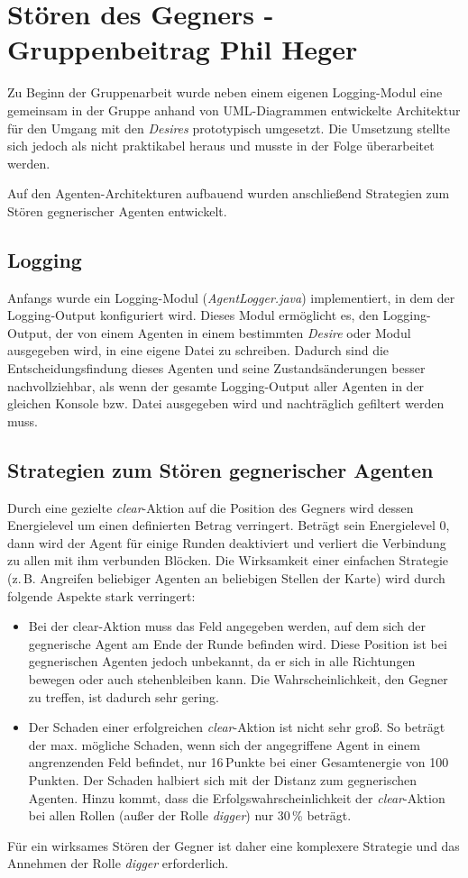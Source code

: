\documentclass[runningheads]{llncs}
\begin{document}
	\section{Stören des Gegners - Gruppenbeitrag Phil Heger}
	Zu Beginn der Gruppenarbeit wurde neben einem eigenen Logging-Modul eine gemeinsam in der Gruppe anhand von UML-Diagrammen entwickelte Architektur für den Umgang mit den \textit{Desires} prototypisch umgesetzt. Die Umsetzung stellte sich jedoch als nicht praktikabel heraus und musste in der Folge überarbeitet werden. 
	
	Auf den Agenten-Architekturen aufbauend wurden anschließend Strategien zum Stören gegnerischer Agenten entwickelt.
	
	\subsection{Logging}
	Anfangs wurde ein Logging-Modul (\textit{AgentLogger.java}) implementiert, in dem der Logging-Output konfiguriert wird. Dieses Modul ermöglicht es, den Logging-Output, der von einem Agenten in einem bestimmten \textit{Desire} oder Modul ausgegeben wird, in eine eigene Datei zu schreiben. Dadurch sind die Entscheidungsfindung dieses Agenten und seine Zustandsänderungen besser nachvollziehbar, als wenn der gesamte Logging-Output aller Agenten in der gleichen Konsole bzw. Datei ausgegeben wird und nachträglich gefiltert werden muss. 
	
	\subsection{Strategien zum Stören gegnerischer Agenten}
	Durch eine gezielte \textit{clear}-Aktion auf die Position des Gegners wird dessen Energielevel um einen definierten Betrag verringert. Beträgt sein Energielevel 0, dann wird der Agent für einige Runden deaktiviert und verliert die Verbindung zu allen mit ihm verbunden Blöcken. Die Wirksamkeit einer einfachen Strategie (z.\,B. Angreifen beliebiger Agenten an beliebigen Stellen der Karte) wird durch folgende Aspekte stark verringert:
	\begin{itemize}
		\item{Bei der clear-Aktion muss das Feld angegeben werden, auf dem sich der gegnerische Agent am Ende der Runde befinden wird. Diese Position ist bei gegnerischen Agenten jedoch unbekannt, da er sich in alle Richtungen bewegen oder auch stehenbleiben kann. Die Wahrscheinlichkeit, den Gegner zu treffen, ist dadurch sehr gering.}
		\item{Der Schaden einer erfolgreichen \textit{clear}-Aktion ist nicht sehr groß. So beträgt der max. mögliche Schaden, wenn sich der angegriffene Agent in einem angrenzenden Feld befindet, nur 16\,Punkte bei einer Gesamtenergie von 100\,Punkten. Der Schaden halbiert sich mit der Distanz zum gegnerischen Agenten. Hinzu kommt, dass die Erfolgswahrscheinlichkeit der \textit{clear}-Aktion bei allen Rollen (außer der Rolle \textit{digger}) nur 30\,\% beträgt.}
	\end{itemize}
	Für ein wirksames Stören der Gegner ist daher eine komplexere Strategie und das Annehmen der Rolle \textit{digger} erforderlich.
	
\end{document}
